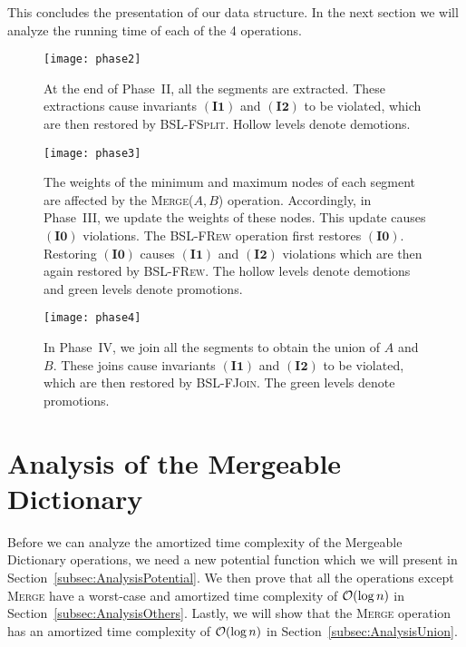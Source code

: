 \documentclass[11pt]{article}
\newcommand{\Ds}{Mergeable Dictionary}
\newcommand{\kwUnion}{Merge}
\newcommand{\Union}{\mbox{\textsc{\kwUnion{}}}}
\newcommand{\Unionx}[2]{\mbox{\textsc{\kwUnion(\ensuremath{#1,#2})}}}
\newcommand{\Bslfspl}{\mbox{\textsc{BSL-FSplit}}}
\newcommand{\Bslfjoin}{\mbox{\textsc{BSL-FJoin}}}
\newcommand{\Bslfrew}{\mbox{\textsc{BSL-FRew}}}
\newcommand{\opcount}{4}
\newcommand{\segments}{{\segment}s}
\newcommand{\segment}{segment}
\newcommand{\invzero}{\ensuremath{\mathbf{(I0)}}}
\newcommand{\invone}{\ensuremath{\mathbf{(I1)}}}
\newcommand{\invtwo}{\ensuremath{\mathbf{(I2)}}}
\newcommand{\set}[1]{\ensuremath{#1}}
\newcounter{count}
\begin{document}
This concludes the presentation of our data structure. In the next section we will analyze the running time of each of the \opcount{} operations. 


\begin{figure}[H]
\centering 
\texttt{[image: phase2]} 
\caption{At the end of Phase~II, all the \segments{} are extracted. These extractions cause invariants \invone{} and \invtwo{} to be violated, which are then restored by \Bslfspl{}. Hollow levels denote demotions.} 
\label{fig:extractints} 
\end{figure}

\begin{figure}[H]
\centering 
\texttt{[image: phase3]} 
\caption{The weights of the minimum and maximum nodes of each \segment{} are affected by the \Unionx{A}{B} operation. Accordingly, in Phase~III, we update the weights of these nodes. This update causes \invzero{} violations. The \Bslfrew{} operation first restores \invzero{}. Restoring \invzero{} causes \invone{} and \invtwo{} violations which are then again restored by \Bslfrew{}. The hollow levels denote demotions and green levels denote promotions.} 
\label{fig:updateweights} 
\end{figure}

\begin{figure}[H]
\centering 
\texttt{[image: phase4]} 
\caption{In Phase~IV, we join all the \segments{} to obtain the union of \set A and \set B. These joins cause invariants \invone{} and \invtwo{} to be violated, which are then restored by \Bslfjoin{}. The green levels denote promotions.} 
\label{fig:glueints} 
\end{figure} 






\section{Analysis of the Mergeable Dictionary} 
\label{sec:Analysis} 



Before we can analyze the amortized time complexity of the \Ds{} operations, we need a new potential function which we will present in Section~\ref{subsec:AnalysisPotential}. We then prove that all the operations except \Union{} have a worst-case and amortized time complexity of ${\cal O}(\log n)$ in Section~\ref{subsec:AnalysisOthers}. Lastly, we will show that the \Union{} operation has an amortized time complexity of ${\cal O}(\log n)$ in Section~\ref{subsec:AnalysisUnion}. 
\end{document}
